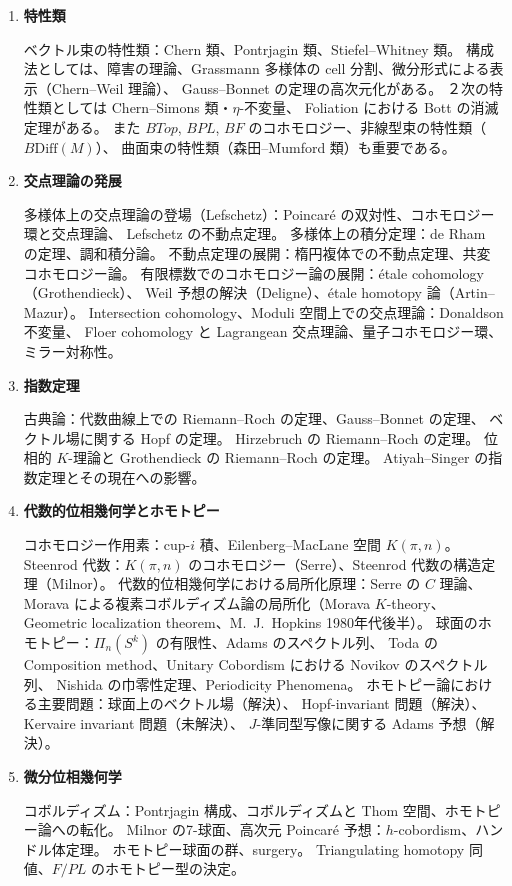 \documentclass[uplatex,dvipdfmx]{jlreq}
\begin{document}
\begin{enumerate}
  \item \textbf{特性類}

  ベクトル束の特性類：Chern 類、Pontrjagin 類、Stiefel--Whitney 類。
  構成法としては、障害の理論、Grassmann 多様体の cell 分割、微分形式による表示（Chern--Weil 理論）、
  Gauss--Bonnet の定理の高次元化がある。
  ２次の特性類としては Chern--Simons 類・$\eta$-不変量、
  Foliation における Bott の消滅定理がある。
  また $BTop$, $BPL$, $BF$ のコホモロジー、非線型束の特性類（$B\mathrm{Diff}(M)$）、
  曲面束の特性類（森田--Mumford 類）も重要である。

  \item \textbf{交点理論の発展}

  多様体上の交点理論の登場（Lefschetz）：Poincaré の双対性、コホモロジー環と交点理論、
  Lefschetz の不動点定理。
  多様体上の積分定理：de Rham の定理、調和積分論。
  不動点定理の展開：楕円複体での不動点定理、共変コホモロジー論。
  有限標数でのコホモロジー論の展開：étale cohomology（Grothendieck）、
  Weil 予想の解決（Deligne）、étale homotopy 論（Artin--Mazur）。
  Intersection cohomology、Moduli 空間上での交点理論：Donaldson 不変量、
  Floer cohomology と Lagrangean 交点理論、量子コホモロジー環、ミラー対称性。

  \item \textbf{指数定理}

  古典論：代数曲線上での Riemann--Roch の定理、Gauss--Bonnet の定理、
  ベクトル場に関する Hopf の定理。
  Hirzebruch の Riemann--Roch の定理。
  位相的 $K$-理論と Grothendieck の Riemann--Roch の定理。
  Atiyah--Singer の指数定理とその現在への影響。

  \item \textbf{代数的位相幾何学とホモトピー}

  コホモロジー作用素：cup-$i$ 積、Eilenberg--MacLane 空間 $K(\pi,n)$。
  Steenrod 代数：$K(\pi,n)$ のコホモロジー（Serre）、Steenrod 代数の構造定理（Milnor）。
  代数的位相幾何学における局所化原理：Serre の $C$ 理論、
  Morava による複素コボルディズム論の局所化（Morava $K$-theory、
  Geometric localization theorem、M.~J.~Hopkins 1980年代後半）。
  球面のホモトピー：$\Pi_n(S^k)$ の有限性、Adams のスペクトル列、
  Toda の Composition method、Unitary Cobordism における Novikov のスペクトル列、
  Nishida の巾零性定理、Periodicity Phenomena。
  ホモトピー論における主要問題：球面上のベクトル場（解決）、
  Hopf-invariant 問題（解決）、Kervaire invariant 問題（未解決）、
  $J$-準同型写像に関する Adams 予想（解決）。

  \item \textbf{微分位相幾何学}

  コボルディズム：Pontrjagin 構成、コボルディズムと Thom 空間、ホモトピー論への転化。
  Milnor の7-球面、高次元 Poincaré 予想：$h$-cobordism、ハンドル体定理。
  ホモトピー球面の群、surgery。
  Triangulating homotopy 同値、$F/PL$ のホモトピー型の決定。
\end{enumerate}
\end{document}
